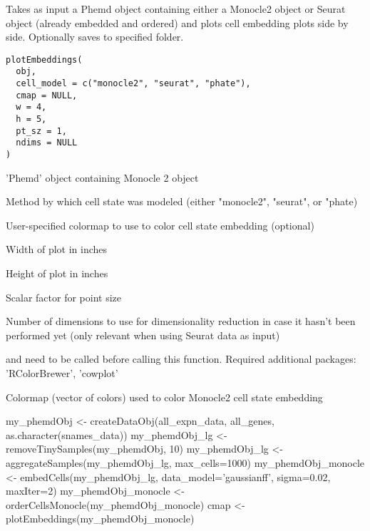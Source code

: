 \documentclass[a4paper]{book}
\begin{document}
%
\begin{Description}\relax
Takes as input a Phemd object containing either a Monocle2 object or Seurat object (already embedded and ordered) and plots cell embedding plots side by side. Optionally saves to specified folder.
\end{Description}
%
\begin{Usage}
\begin{verbatim}
plotEmbeddings(
  obj,
  cell_model = c("monocle2", "seurat", "phate"),
  cmap = NULL,
  w = 4,
  h = 5,
  pt_sz = 1,
  ndims = NULL
)
\end{verbatim}
\end{Usage}
%
\begin{Arguments}
\begin{ldescription}
\item[\code{obj}] 'Phemd' object containing Monocle 2 object

\item[\code{cell\_model}] Method by which cell state was modeled (either "monocle2", "seurat", or "phate)

\item[\code{cmap}] User-specified colormap to use to color cell state embedding (optional)

\item[\code{w}] Width of plot in inches

\item[\code{h}] Height of plot in inches

\item[\code{pt\_sz}] Scalar factor for point size

\item[\code{ndims}] Number of dimensions to use for dimensionality reduction in case it hasn't been performed yet (only relevant when using Seurat data as input)
\end{ldescription}
\end{Arguments}
%
\begin{Details}\relax
{} and  need to be called before calling this function. Required additional packages: 'RColorBrewer', 'cowplot'
\end{Details}
%
\begin{Value}
Colormap (vector of colors) used to color Monocle2 cell state embedding
\end{Value}
%
\begin{Examples}
\begin{ExampleCode}
my_phemdObj <- createDataObj(all_expn_data, all_genes, as.character(snames_data))
my_phemdObj_lg <- removeTinySamples(my_phemdObj, 10)
my_phemdObj_lg <- aggregateSamples(my_phemdObj_lg, max_cells=1000)
my_phemdObj_monocle <- embedCells(my_phemdObj_lg, data_model='gaussianff', sigma=0.02, maxIter=2)
my_phemdObj_monocle <- orderCellsMonocle(my_phemdObj_monocle)
cmap <- plotEmbeddings(my_phemdObj_monocle)
\end{ExampleCode}
\end{Examples}
\end{document}
